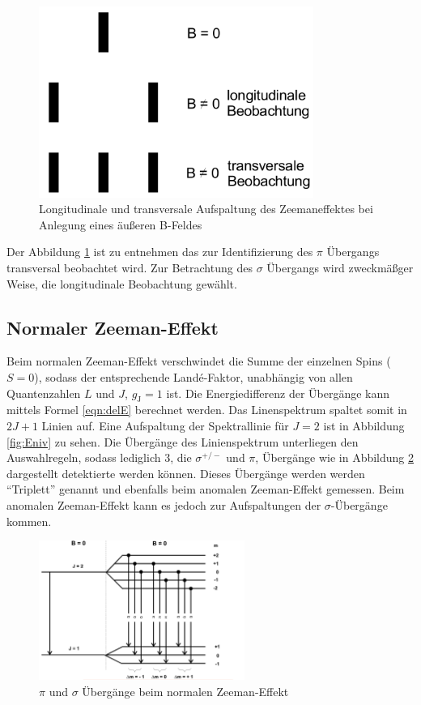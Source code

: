 \begin{figure}[H]
  \centering
  \includegraphics[width=0.8\textwidth]{./Bilder/Aufspaltung.png}
  \caption{Longitudinale und transversale Aufspaltung des Zeemaneffektes bei Anlegung eines äußeren B-Feldes \cite{V27}}
  \label{fig:aufZe}
\end{figure}
Der Abbildung \ref{fig:aufZe} ist zu entnehmen das zur Identifizierung des $\pi$ Übergangs transversal beobachtet wird. Zur Betrachtung des $\sigma$ Übergangs wird zweckmäßger Weise, die longitudinale Beobachtung gewählt. 
\subsection{Normaler Zeeman-Effekt}
Beim normalen Zeeman-Effekt verschwindet die Summe der einzelnen Spins ($S=0$), sodass der entsprechende Landé-Faktor, unabhängig von allen Quantenzahlen $L$ und $J$, $g_\text{J} = 1$ ist. Die Energiedifferenz der Übergänge kann mittels Formel \ref{eqn:delE} berechnet werden. Das Linenspektrum spaltet somit in $2 J + 1$ Linien auf. Eine Aufspaltung der Spektrallinie für $J = 2$ ist in Abbildung \ref{fig:Eniv} zu sehen.
Die Übergänge des Linienspektrum unterliegen den Auswahlregeln, sodass lediglich 3, die $\sigma^{+/-}$ und $\pi$, Übergänge wie in Abbildung \ref{fig:adf} dargestellt detektierte werden können. Dieses Übergänge werden werden ``Triplett'' genannt und ebenfalls beim anomalen Zeeman-Effekt gemessen. Beim anomalen Zeeman-Effekt kann es jedoch zur Aufspaltungen der $\sigma$-Übergänge kommen.
\begin{figure}[H]
  \centering
  \includegraphics[width=0.6\textwidth]{./Bilder/asd.pdf}
  \caption{$\pi$ und $\sigma$ Übergänge beim normalen Zeeman-Effekt \cite{V27}}
  \label{fig:adf}
\end{figure}

